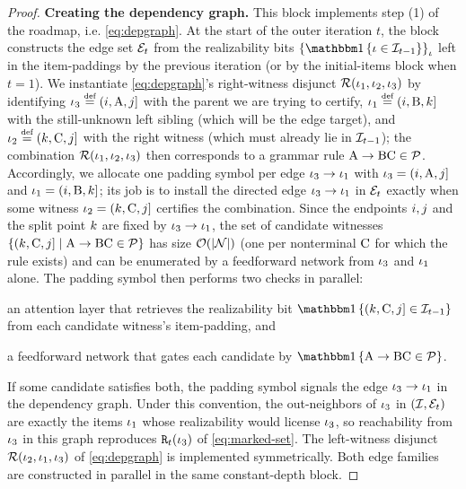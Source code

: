 \documentclass{article}
\begin{document}
\begin{proof}
    \textbf{Creating the dependency graph.}
    This block implements step (1) of the roadmap, i.e. \cref{eq:depgraph}.
    At the start of the outer iteration $t$, the block constructs the edge set ${\mathcal{E}}_t$ from the realizability bits $\set{\ind{\itm \in \items_{t-1}}}_\itm$ left in the item-paddings by the previous iteration (or by the initial-items block when $t=1$).
    We instantiate \cref{eq:depgraph}'s right-witness disjunct ${{{ \mathcal{R}}}}({{ \iota}}_1, {{ \iota}}_2, {{ \iota}}_3)$ by identifying $\itm_3 \defeq (\idxi, \NT{A}, \idxj]$ with the parent we are trying to certify, $\itm_1 \defeq (\idxi, \NT{B}, \idxk]$ with the still-unknown left sibling (which will be the edge target), and $\itm_2 \defeq (\idxk, \NT{C}, \idxj]$ with the right witness (which must already lie in ${{\mathcal{I}}}_{t-1}$); the combination ${{{ \mathcal{R}}}}({{ \iota}}_1, {{ \iota}}_2, {{ \iota}}_3)$ then corresponds to a grammar rule ${{ {{ \mathrm{A}}} \rightarrow {{ \mathrm{B}}} {{ \mathrm{C}}}}} \in {{ \mathcal{P}}}$.
    Accordingly, we allocate one padding symbol per edge ${{ \iota}}_3 \to {{ \iota}}_1$ with ${{ \iota}}_3 = ({{ i}}, {{ \mathrm{A}}}, {{ j}}]$ and ${{ \iota}}_1 = ({{ i}}, {{ \mathrm{B}}}, {{ k}}]$; its job is to install the directed edge ${{ \iota}}_3 \to {{ \iota}}_1$ in ${\mathcal{E}}_t$ exactly when some witness ${{ \iota}}_2 = ({{ k}}, {{ \mathrm{C}}}, {{ j}}]$ certifies the combination.
    Since the endpoints ${{ i}}, {{ j}}$ and the split point ${{ k}}$ are fixed by ${{ \iota}}_3 \to {{ \iota}}_1$, the set of candidate witnesses ${{\{ ({{ k}}, {{ \mathrm{C}}}, {{ j}}] \mid {{ {{ \mathrm{A}}} \rightarrow {{ \mathrm{B}}} {{ \mathrm{C}}}}} \in {{ \mathcal{P}}} \}}}$ has size ${{ \mathcal{O}}}(|{{ \mathcal{N}}}|)$ (one per nonterminal ${{ \mathrm{C}}}$ for which the rule exists) and can be enumerated by a feedforward network from ${{ \iota}}_3$ and ${{ \iota}}_1$ alone.
    The padding symbol then performs two checks in parallel: 
    \begin{enumerate*}[label=\textit{(\roman*)}]
        \item an attention layer that retrieves the realizability bit $\ind{(\idxk, \NT{C}, \idxj] \in \items_{t-1}}$ from each candidate witness's item-padding, and
        \item a feedforward network that gates each candidate by $\ind{\production{\NT{A}}{\NT{B} \NT{C}} \in \rules}$.
    \end{enumerate*}
    If some candidate satisfies both, the padding symbol signals the edge ${{ \iota}}_3 \to {{ \iota}}_1$ in the dependency graph.
    Under this convention, the out-neighbors of ${{ \iota}}_3$ in $({{\mathcal{I}}}, {\mathcal{E}}_t)$ are exactly the items ${{ \iota}}_1$ whose realizability would license ${{ \iota}}_3$, so reachability from ${{ \iota}}_3$ in this graph reproduces ${\mathtt{R}}_t({{ \iota}}_3)$ of \cref{eq:marked-set}.
    The left-witness disjunct ${{{ \mathcal{R}}}}({{ \iota}}_2, {{ \iota}}_1, {{ \iota}}_3)$ of \cref{eq:depgraph} is implemented symmetrically.
    Both edge families are constructed in parallel in the same constant-depth block.
    

\end{proof}
\end{document}
